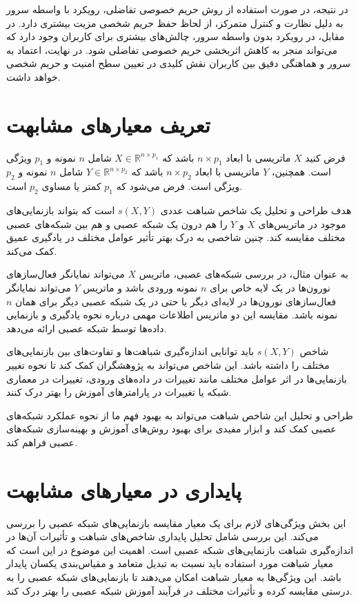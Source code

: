 در نتیجه، در صورت استفاده از روش حریم خصوصی تفاضلی، رویکرد با واسطه سرور به دلیل نظارت و کنترل متمرکز، از لحاظ حفظ حریم شخصی مزیت بیشتری دارد. در مقابل، در رویکرد بدون واسطه سرور، چالش‌های بیشتری برای کاربران وجود دارد که می‌تواند منجر به کاهش اثربخشی حریم خصوصی تفاضلی شود. در نهایت، اعتماد به سرور و هماهنگی دقیق بین کاربران نقش کلیدی در تعیین سطح امنیت و حریم شخصی خواهد داشت.



\section{
	تعریف معیارهای مشابهت
}
فرض کنید \( X \) ماتریسی با ابعاد \( n \times p_1 \) باشد که \( X \in \mathbb{R}^{n \times p_1} \) شامل \( n \) نمونه و \( p_1 \) ویژگی است. همچنین، \( Y \) ماتریسی با ابعاد \( n \times p_2 \) باشد که \( Y \in \mathbb{R}^{n \times p_2} \) شامل \( n \) نمونه و \( p_2 \) ویژگی است. فرض می‌شود که \( p_1 \) کمتر یا مساوی \( p_2 \) است.


هدف طراحی و تحلیل یک شاخص شباهت عددی \( s(X, Y) \) است که بتواند بازنمایی‌های%
موجود در ماتریس‌های \( X \) و \( Y \) را هم درون یک شبکه عصبی و هم بین شبکه‌های عصبی مختلف مقایسه کند. چنین شاخصی به درک بهتر تأثیر عوامل مختلف در یادگیری عمیق کمک می‌کند.

به عنوان مثال، در بررسی شبکه‌های عصبی، ماتریس \( X \) می‌تواند نمایانگر فعال‌سازهای%
نورون‌ها در یک لایه خاص برای \( n \) نمونه ورودی باشد و ماتریس \( Y \) می‌تواند نمایانگر فعال‌سازهای نورون‌ها در لایه‌ای دیگر یا حتی در یک شبکه عصبی دیگر برای همان \( n \) نمونه باشد. مقایسه این دو ماتریس اطلاعات مهمی درباره نحوه یادگیری و بازنمایی داده‌ها توسط شبکه عصبی ارائه می‌دهد.

شاخص \( s(X, Y) \) باید توانایی اندازه‌گیری شباهت‌ها و تفاوت‌های بین بازنمایی‌های مختلف را داشته باشد. این شاخص می‌تواند به پژوهشگران کمک کند تا نحوه تغییر بازنمایی‌ها در اثر عوامل مختلف مانند تغییرات در داده‌های ورودی، تغییرات در معماری شبکه یا تغییرات در پارامترهای آموزش را بهتر درک کنند.

طراحی و تحلیل این شاخص شباهت می‌تواند به بهبود فهم ما از نحوه عملکرد شبکه‌های عصبی کمک کند و ابزار مفیدی برای بهبود روش‌های آموزش و بهینه‌سازی شبکه‌های عصبی فراهم کند.


\section{
	پایداری در معیارهای مشابهت
}
این بخش ویژگی‌های لازم برای یک معیار مقایسه بازنمایی‌های شبکه عصبی را بررسی می‌کند. این بررسی شامل تحلیل پایداری شاخص‌های شباهت و تأثیرات آن‌ها در اندازه‌گیری شباهت بازنمایی‌های شبکه عصبی است. اهمیت این موضوع در این است که معیار شباهت مورد استفاده باید نسبت به تبدیل متعامد%
و مقیاس‌بندی یکسان%
پایدار باشد. این ویژگی‌ها به معیار شباهت امکان می‌دهند تا بازنمایی‌های شبکه عصبی را به درستی مقایسه کرده و تأثیرات مختلف در فرآیند آموزش شبکه عصبی را بهتر درک کند.


